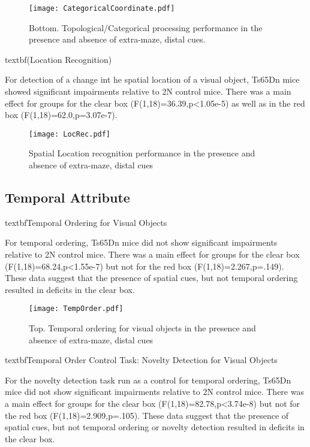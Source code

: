 \documentclass{article}
\begin{document}
\begin{figure}[h!]
\centering
\texttt{[image: CategoricalCoordinate.pdf]}
\caption{Bottom. Topological/Categorical processing performance in the presence and absence of extra-maze, distal cues.}
\label{fig:MetricTopological}
\end{figure}

textbf(Location Recognition)

For detection of a change int he spatial location of a visual object, Ts65Dn mice showed significant impairments relative to 2N control mice. There was a main effect for groups for the clear box (F(1,18)=36.39,p<1.05e-5) as well as in the red box (F(1,18)=62.0,p=3.07e-7).

\begin{figure}[h!]
\centering
\texttt{[image: LocRec.pdf]}
\caption{Spatial Location recognition performance in the presence and absence of extra-maze, distal cues}
\label{fig:LocationRecognition}
\end{figure}

\subsection{Temporal Attribute}

textbf{Temporal Ordering for Visual Objects}

For temporal ordering, Ts65Dn mice did not show significant impairments relative to 2N control mice. There was a main effect for groups for the clear box (F(1,18)=68.24,p<1.55e-7) but not for the red box (F(1,18)=2.267,p=.149). These data suggest that the presence of spatial cues, but not temporal ordering resulted in deficits in the clear box.

\begin{figure}[h!]
\centering
\texttt{[image: TempOrder.pdf]}
\caption{Top. Temporal ordering for visual objects in the presence and absence of extra-maze, distal cues}
\label{fig:TemporalOrder}
\end{figure}

textbf{Temporal Order Control Task: Novelty Detection for Visual Objects}

For the novelty detection task run as a control for temporal ordering, Ts65Dn mice did not show significant impairments relative to 2N control mice. There was a main effect for groups for the clear box (F(1,18)=82.78,p<3.74e-8) but not for the red box (F(1,18)=2.909,p=.105). These data suggest that the presence of spatial cues, but not temporal ordering or novelty detection resulted in deficits in the clear box.
\end{document}
